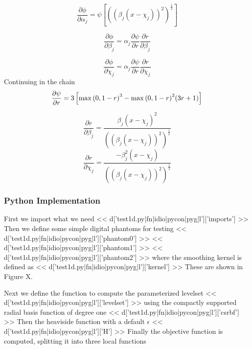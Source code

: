 \documentclass[]{article}
\begin{document}
\begin{equation}
\frac{\partial \phi}{\partial \alpha_j} = \psi \left [ ((\beta_j(x-\chi_j))^2)^{\frac{1}{2}}\right ]
\end{equation}

\begin{equation}
\frac{\partial \phi}{\partial \beta_j} = \alpha_j \frac{\partial
  \psi}{\partial r} \frac{\partial r}{\partial \beta_j}
\end{equation}

\begin{equation}
\frac{\partial \phi}{\partial \chi_j} = \alpha_j \frac{\partial
  \psi}{\partial r} \frac{\partial r}{\partial \chi_j}
\end{equation}
Continuing in the chain
\begin{equation}
\frac{\partial \psi}{\partial r} = 3\left [ \max{(0,1-r)}^3 -
  \max{(0,1-r)}^2(3r+1) \right ]\\
\end{equation}

\begin{equation}
\frac{\partial r}{\partial \beta_j} = 
\frac{\beta_j(x-\chi_j)^2}{((\beta_j(x-\chi_j))^2)^{\frac{1}{2}}}
\end{equation}
\begin{equation}
\frac{\partial r}{\partial \chi_j} = 
\frac{-\beta_j^2(x-\chi_j)}{((\beta_j(x-\chi_j))^2)^{\frac{1}{2}}}
\end{equation}

\subsubsection{Python Implementation}
First we import what we need
<< d['test1d.py|fn|idio|pycon|pyg|l']['imports'] >>
Then we define some simple digital phantoms for testing
<< d['test1d.py|fn|idio|pycon|pyg|l']['phantom0'] >>
<< d['test1d.py|fn|idio|pycon|pyg|l']['phantom1'] >>
<< d['test1d.py|fn|idio|pycon|pyg|l']['phantom2'] >>
where the smoothing kernel is defined as
<< d['test1d.py|fn|idio|pycon|pyg|l']['kernel'] >>
These are shown in Figure X.

Next we define the function to compute the parameterized levelset
<< d['test1d.py|fn|idio|pycon|pyg|l']['levelset'] >>
using the compactly supported radial basis function of degree one
<< d['test1d.py|fn|idio|pycon|pyg|l']['csrbf'] >>
Then the heaviside function with a default \( \epsilon \)
<< d['test1d.py|fn|idio|pycon|pyg|l']['H'] >>
Finally the objective function is computed, splitting it into three
local functions
\end{document}
